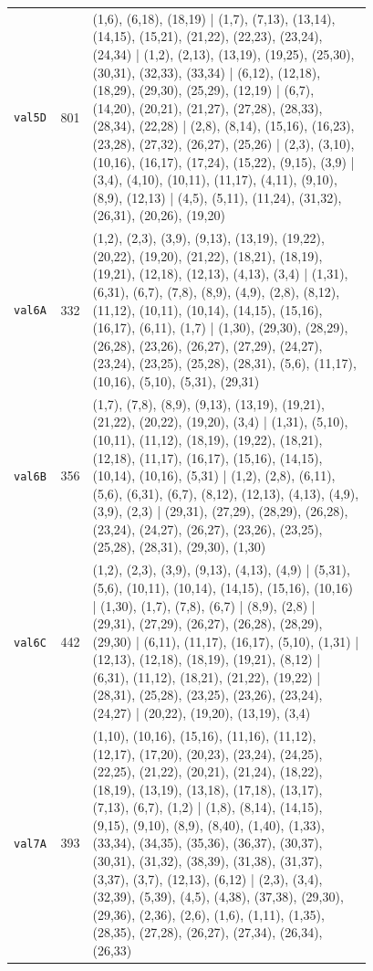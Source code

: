 \begin{landscape}
\begin{longtable}{lr>{\tiny\raggedright\arraybackslash}p{0.78\linewidth}}
\texttt{val5D} & 801 & (1,6), (6,18), (18,19) | (1,7), (7,13), (13,14), (14,15), (15,21), (21,22), (22,23), (23,24), (24,34) | (1,2), (2,13), (13,19), (19,25), (25,30), (30,31), (32,33), (33,34) | (6,12), (12,18), (18,29), (29,30), (25,29), (12,19) | (6,7), (14,20), (20,21), (21,27), (27,28), (28,33), (28,34), (22,28) | (2,8), (8,14), (15,16), (16,23), (23,28), (27,32), (26,27), (25,26) | (2,3), (3,10), (10,16), (16,17), (17,24), (15,22), (9,15), (3,9) | (3,4), (4,10), (10,11), (11,17), (4,11), (9,10), (8,9), (12,13) | (4,5), (5,11), (11,24), (31,32), (26,31), (20,26), (19,20) \\[2pt]
\texttt{val6A} & 332 & (1,2), (2,3), (3,9), (9,13), (13,19), (19,22), (20,22), (19,20), (21,22), (18,21), (18,19), (19,21), (12,18), (12,13), (4,13), (3,4) | (1,31), (6,31), (6,7), (7,8), (8,9), (4,9), (2,8), (8,12), (11,12), (10,11), (10,14), (14,15), (15,16), (16,17), (6,11), (1,7) | (1,30), (29,30), (28,29), (26,28), (23,26), (26,27), (27,29), (24,27), (23,24), (23,25), (25,28), (28,31), (5,6), (11,17), (10,16), (5,10), (5,31), (29,31) \\[2pt]
\texttt{val6B} & 356 & (1,7), (7,8), (8,9), (9,13), (13,19), (19,21), (21,22), (20,22), (19,20), (3,4) | (1,31), (5,10), (10,11), (11,12), (18,19), (19,22), (18,21), (12,18), (11,17), (16,17), (15,16), (14,15), (10,14), (10,16), (5,31) | (1,2), (2,8), (6,11), (5,6), (6,31), (6,7), (8,12), (12,13), (4,13), (4,9), (3,9), (2,3) | (29,31), (27,29), (28,29), (26,28), (23,24), (24,27), (26,27), (23,26), (23,25), (25,28), (28,31), (29,30), (1,30) \\[2pt]
\texttt{val6C} & 442 & (1,2), (2,3), (3,9), (9,13), (4,13), (4,9) | (5,31), (5,6), (10,11), (10,14), (14,15), (15,16), (10,16) | (1,30), (1,7), (7,8), (6,7) | (8,9), (2,8) | (29,31), (27,29), (26,27), (26,28), (28,29), (29,30) | (6,11), (11,17), (16,17), (5,10), (1,31) | (12,13), (12,18), (18,19), (19,21), (8,12) | (6,31), (11,12), (18,21), (21,22), (19,22) | (28,31), (25,28), (23,25), (23,26), (23,24), (24,27) | (20,22), (19,20), (13,19), (3,4) \\[2pt]
\texttt{val7A} & 393 & (1,10), (10,16), (15,16), (11,16), (11,12), (12,17), (17,20), (20,23), (23,24), (24,25), (22,25), (21,22), (20,21), (21,24), (18,22), (18,19), (13,19), (13,18), (17,18), (13,17), (7,13), (6,7), (1,2) | (1,8), (8,14), (14,15), (9,15), (9,10), (8,9), (8,40), (1,40), (1,33), (33,34), (34,35), (35,36), (36,37), (30,37), (30,31), (31,32), (38,39), (31,38), (31,37), (3,37), (3,7), (12,13), (6,12) | (2,3), (3,4), (32,39), (5,39), (4,5), (4,38), (37,38), (29,30), (29,36), (2,36), (2,6), (1,6), (1,11), (1,35), (28,35), (27,28), (26,27), (27,34), (26,34), (26,33) \\[2pt]

\end{longtable}
\end{landscape}

